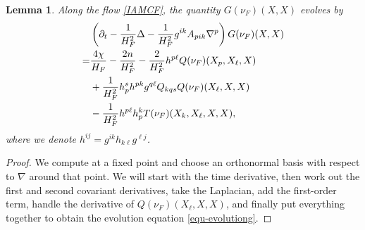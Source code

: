 \documentclass[10pt,a4paper]{amsart}
\newtheorem{lemma}[proposition]{Lemma}
\numberwithin{equation}{section}
\begin{document}
	\begin{lemma}
		Along the flow \eqref{IAMCF}, the quantity $G(\nu_F)(X,X)$ evolves by
		\begin{align}
			&\left( \partial_t - \dfrac{1}{H_F^2}\Delta - \dfrac{1}{H_F^2} g^{ik}A_{pik}\nabla^p  \right)G(\nu_F)(X,X)\notag\\
			=& \dfrac{4\chi}{H_F}-\dfrac{2n}{H_F^2} -\dfrac{2}{H_F^2}h^{p\ell}Q(\nu_F)(X_p,X_{\ell},X) \notag\\
			&+\dfrac{1}{H_F^2}h^s_ph^{pk}g^{q\ell}Q_{kqs}Q(\nu_F)(X_{\ell},X,X) \nonumber\\
			&- \dfrac{1}{H_F^2} h^{p\ell}h^k_p T(\nu_F)(X_k,X_{\ell},X,X), \label{equ-evolutiong}
		\end{align}
		where we denote $h^{ij}=g^{ik}h_{k\ell}g^{\ell j}$.
	\end{lemma}
	\begin{proof}
		We compute at a fixed point and choose an orthonormal basis with respect to $\nabla$ around that point. We will start with the time derivative, then work out the first and second covariant derivatives, take the Laplacian, add the first-order term, handle the derivative of $Q(\nu_F)(X_{\ell},X,X)$, and finally put everything together to obtain the evolution equation \eqref{equ-evolutiong}.
		

\end{proof}
\end{document}
